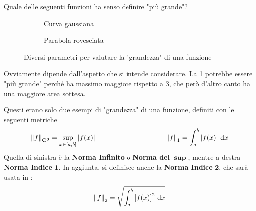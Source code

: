 Quale delle seguenti funzioni ha senso definire "più grande"?
\begin{figure}[H]
	\begin{subfigure}{.49\textwidth}
		\centering
		\caption{Curva gaussiana}
		\label{pic:grand_funz_gauss}
	\end{subfigure}
	\begin{subfigure}{.49\textwidth}
		\centering
		\caption{Parabola rovesciata}
		\label{pic:grand_funz_parab}
	\end{subfigure}
	\caption{Diversi parametri per valutare la "grandezza" di una funzione}
\end{figure}

Ovviamente dipende dall'aspetto che si intende considerare. La \ref{pic:grand_funz_gauss} potrebbe essere "più grande" perché ha massimo maggiore rispetto a \ref{pic:grand_funz_parab}, che però d'altro canto ha una maggiore area sottesa.

Questi erano solo due esempi di "grandezza" di una funzione, definiti con le seguenti metriche
\[
	\left\|f\right\|_{\mathbf{C^{0}}} = \sup\limits_{x \in \left[a,b\right]} \left|f(x)\right|
	\qquad\qquad\qquad\qquad\qquad
	\left\|f\right\|_1 = \int_a^b \left|f(x)\right| \,\mathrm{d}{x}
\]
Quella di sinistra è la \textbf{Norma Infinito} o \textbf{Norma del} $\boldsymbol{\sup}$, mentre a destra \textbf{Norma Indice} $\boldsymbol{1}$. In aggiunta, si definisce anche la \textbf{Norma Indice} $\boldsymbol{2}$, che sarà usata in :
\[\left\|f\right\|_2 = \sqrt{ \int_a^b \left[f(x)\right]^2 \,\mathrm{d}{x} }\]

